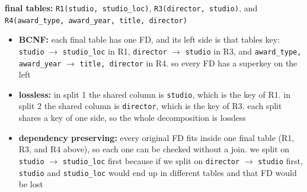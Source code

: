 \documentclass[11pt]{article}
\newcommand{\at}[1]{\texttt{#1}}
\begin{document}
\noindent\textbf{final tables:} \at{R1(studio, studio\_loc)},
\at{R3(director, studio)}, and \at{R4(award\_type, award\_year, title,
director)}

\begin{itemize}
  \item \textbf{BCNF:} each final table has one FD, and its left side is
    that tables key: \at{studio} $\to$ \at{studio\_loc} in R1,
    \at{director} $\to$ \at{studio} in R3, and \at{award\_type, award\_year}
    $\to$ \at{title, director} in R4. so every FD has a superkey on the left
  \item \textbf{lossless:} in split 1 the shared column is \at{studio}, which
    is the key of R1. in split 2 the shared column is \at{director}, which is
    the key of R3. each split shares a key of one side, so the whole
    decomposition is lossless
  \item \textbf{dependency preserving:} every original FD fits inside one
    final table (R1, R3, and R4 above), so each one can be checked without a
    join. we split on \at{studio} $\to$ \at{studio\_loc} first because if we
    split on \at{director} $\to$ \at{studio} first, \at{studio} and
    \at{studio\_loc} would end up in different tables and that FD would be
    lost
\end{itemize}
\end{document}
